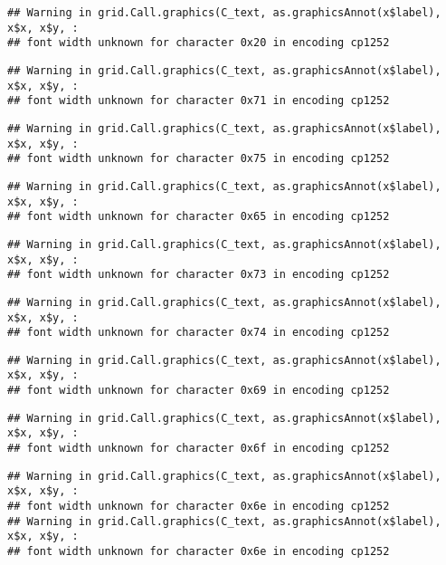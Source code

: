 \documentclass[
]{article}
\begin{document}
\begin{verbatim}
## Warning in grid.Call.graphics(C_text, as.graphicsAnnot(x$label), x$x, x$y, :
## font width unknown for character 0x20 in encoding cp1252
\end{verbatim}

\begin{verbatim}
## Warning in grid.Call.graphics(C_text, as.graphicsAnnot(x$label), x$x, x$y, :
## font width unknown for character 0x71 in encoding cp1252
\end{verbatim}

\begin{verbatim}
## Warning in grid.Call.graphics(C_text, as.graphicsAnnot(x$label), x$x, x$y, :
## font width unknown for character 0x75 in encoding cp1252
\end{verbatim}

\begin{verbatim}
## Warning in grid.Call.graphics(C_text, as.graphicsAnnot(x$label), x$x, x$y, :
## font width unknown for character 0x65 in encoding cp1252
\end{verbatim}

\begin{verbatim}
## Warning in grid.Call.graphics(C_text, as.graphicsAnnot(x$label), x$x, x$y, :
## font width unknown for character 0x73 in encoding cp1252
\end{verbatim}

\begin{verbatim}
## Warning in grid.Call.graphics(C_text, as.graphicsAnnot(x$label), x$x, x$y, :
## font width unknown for character 0x74 in encoding cp1252
\end{verbatim}

\begin{verbatim}
## Warning in grid.Call.graphics(C_text, as.graphicsAnnot(x$label), x$x, x$y, :
## font width unknown for character 0x69 in encoding cp1252
\end{verbatim}

\begin{verbatim}
## Warning in grid.Call.graphics(C_text, as.graphicsAnnot(x$label), x$x, x$y, :
## font width unknown for character 0x6f in encoding cp1252
\end{verbatim}

\begin{verbatim}
## Warning in grid.Call.graphics(C_text, as.graphicsAnnot(x$label), x$x, x$y, :
## font width unknown for character 0x6e in encoding cp1252
## Warning in grid.Call.graphics(C_text, as.graphicsAnnot(x$label), x$x, x$y, :
## font width unknown for character 0x6e in encoding cp1252
\end{verbatim}
\end{document}
